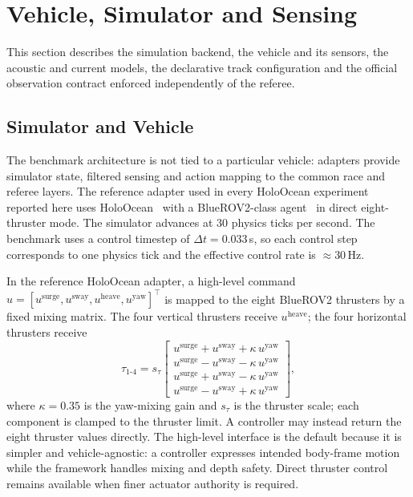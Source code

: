 \section{Vehicle, Simulator and Sensing}
\label{sec:configuration}

This section describes the simulation backend, the vehicle and its sensors, the acoustic and current models, the declarative track configuration and the official observation contract enforced independently of the referee.

\subsection{Simulator and Vehicle}

The benchmark architecture is not tied to a particular vehicle: adapters provide simulator state, filtered sensing and action mapping to the common race and referee layers. The reference adapter used in every HoloOcean experiment reported here uses HoloOcean~\cite{potokar2022holoocean} with a BlueROV2-class agent~\cite{vonbenzon2022bluerov2} in direct eight-thruster mode. The simulator advances at $30$ physics ticks per second. The benchmark uses a control timestep of $\Delta t=0.033$\,s, so each control step corresponds to one physics tick and the effective control rate is $\approx\!30$\,Hz.

In the reference HoloOcean adapter, a high-level command $u=[u^{\mathrm{surge}},u^{\mathrm{sway}},u^{\mathrm{heave}},u^{\mathrm{yaw}}]^{\!\top}$ is mapped to the eight BlueROV2 thrusters by a fixed mixing matrix. The four vertical thrusters receive $u^{\mathrm{heave}}$; the four horizontal thrusters receive
\begin{equation}
\label{eq:thruster_mix}
\tau_{1\text{-}4}= s_\tau\!\begin{bmatrix} u^{\mathrm{surge}}+u^{\mathrm{sway}}+\kappa\,u^{\mathrm{yaw}} \\[1pt] u^{\mathrm{surge}}-u^{\mathrm{sway}}-\kappa\,u^{\mathrm{yaw}} \\[1pt] u^{\mathrm{surge}}+u^{\mathrm{sway}}-\kappa\,u^{\mathrm{yaw}} \\[1pt] u^{\mathrm{surge}}-u^{\mathrm{sway}}+\kappa\,u^{\mathrm{yaw}} \end{bmatrix},
\end{equation}
where $\kappa=0.35$ is the yaw-mixing gain and $s_\tau$ is the thruster scale; each component is clamped to the thruster limit. A controller may instead return the eight thruster values directly. The high-level interface is the default because it is simpler and vehicle-agnostic: a controller expresses intended body-frame motion while the framework handles mixing and depth safety. Direct thruster control remains available when finer actuator authority is required.

